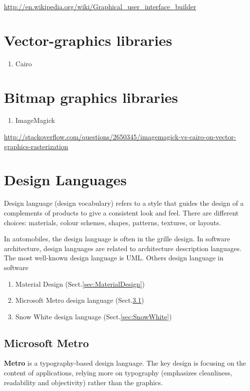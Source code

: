 \url{http://en.wikipedia.org/wiki/Graphical_user_interface_builder}


\section{Vector-graphics libraries}


\begin{enumerate}
  \item Cairo
\end{enumerate}

\section{Bitmap graphics libraries}

\begin{enumerate}
  \item ImageMagick
\end{enumerate}
\url{http://stackoverflow.com/questions/2650345/imagemagick-vs-cairo-on-vector-graphics-rasterization}

\section{Design Languages}

Design language (design vocabulary) refers to a style that guides the design of
a complements of products to give a consistent look and feel. There are
different choices: materials, colour schemes, shapes, patterns, textures, or
layouts. 

In automobiles, the design language is often in the grille design.
In software architecture, design languages are related to architecture
description languages. The most well-known design language is UML. Others design
language in software
\begin{enumerate}
  \item Material Design (Sect.\ref{sec:MaterialDesign})
  \item Microsoft Metro design language (Sect.\ref{sec:Microsoft_Metro})
  \item Snow White design language (Sect.\ref{sec:SnowWhite})
\end{enumerate}

\subsection{Microsoft Metro}
\label{sec:Microsoft_Metro}

{\bf Metro} is a typography-based design language. The key design is focusing on
the content of applications, relying more on typography (emphasizes
cleanliness, readability and objectivity) rather than the graphics. 

